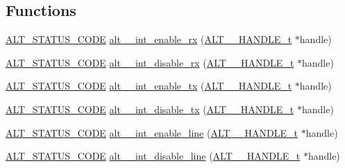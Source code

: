 \subsection*{Functions}
\begin{DoxyCompactItemize}
\item 
\mbox{\hyperlink{hwlib_8h_abdb0d369f069723ca55d6c94bcaaaa12}{A\+L\+T\+\_\+\+S\+T\+A\+T\+U\+S\+\_\+\+C\+O\+DE}} \mbox{\hyperlink{group__UART__INT_gadc2427a611d18ffd5428e21d9b1f686b}{alt\+\_\+\_\+int\+\_\+enable\+\_\+rx}} (\mbox{\hyperlink{group__UART__BASIC_ga4173f362f19fc04032c3859b78d78119}{A\+L\+T\+\_\+\_\+\+H\+A\+N\+D\+L\+E\+\_\+t}} $\ast$handle)
\item 
\mbox{\hyperlink{hwlib_8h_abdb0d369f069723ca55d6c94bcaaaa12}{A\+L\+T\+\_\+\+S\+T\+A\+T\+U\+S\+\_\+\+C\+O\+DE}} \mbox{\hyperlink{group__UART__INT_ga943c30127cde7b6810b5f16c5b2ff621}{alt\+\_\+\_\+int\+\_\+disable\+\_\+rx}} (\mbox{\hyperlink{group__UART__BASIC_ga4173f362f19fc04032c3859b78d78119}{A\+L\+T\+\_\+\_\+\+H\+A\+N\+D\+L\+E\+\_\+t}} $\ast$handle)
\item 
\mbox{\hyperlink{hwlib_8h_abdb0d369f069723ca55d6c94bcaaaa12}{A\+L\+T\+\_\+\+S\+T\+A\+T\+U\+S\+\_\+\+C\+O\+DE}} \mbox{\hyperlink{group__UART__INT_gacf7996755a663902dc9c5bd345056d9b}{alt\+\_\+\_\+int\+\_\+enable\+\_\+tx}} (\mbox{\hyperlink{group__UART__BASIC_ga4173f362f19fc04032c3859b78d78119}{A\+L\+T\+\_\+\_\+\+H\+A\+N\+D\+L\+E\+\_\+t}} $\ast$handle)
\item 
\mbox{\hyperlink{hwlib_8h_abdb0d369f069723ca55d6c94bcaaaa12}{A\+L\+T\+\_\+\+S\+T\+A\+T\+U\+S\+\_\+\+C\+O\+DE}} \mbox{\hyperlink{group__UART__INT_ga99c55935e7fd74bb8b9723a60de4e843}{alt\+\_\+\_\+int\+\_\+disable\+\_\+tx}} (\mbox{\hyperlink{group__UART__BASIC_ga4173f362f19fc04032c3859b78d78119}{A\+L\+T\+\_\+\_\+\+H\+A\+N\+D\+L\+E\+\_\+t}} $\ast$handle)
\item 
\mbox{\hyperlink{hwlib_8h_abdb0d369f069723ca55d6c94bcaaaa12}{A\+L\+T\+\_\+\+S\+T\+A\+T\+U\+S\+\_\+\+C\+O\+DE}} \mbox{\hyperlink{group__UART__INT_gaf8abf58f6417f82f0035b6bdef71728a}{alt\+\_\+\_\+int\+\_\+enable\+\_\+line}} (\mbox{\hyperlink{group__UART__BASIC_ga4173f362f19fc04032c3859b78d78119}{A\+L\+T\+\_\+\_\+\+H\+A\+N\+D\+L\+E\+\_\+t}} $\ast$handle)
\item 
\mbox{\hyperlink{hwlib_8h_abdb0d369f069723ca55d6c94bcaaaa12}{A\+L\+T\+\_\+\+S\+T\+A\+T\+U\+S\+\_\+\+C\+O\+DE}} \mbox{\hyperlink{group__UART__INT_ga652e3e68bb153de588b222bb2b783770}{alt\+\_\+\_\+int\+\_\+disable\+\_\+line}} (\mbox{\hyperlink{group__UART__BASIC_ga4173f362f19fc04032c3859b78d78119}{A\+L\+T\+\_\+\_\+\+H\+A\+N\+D\+L\+E\+\_\+t}} $\ast$handle)

\end{DoxyCompactItemize}
